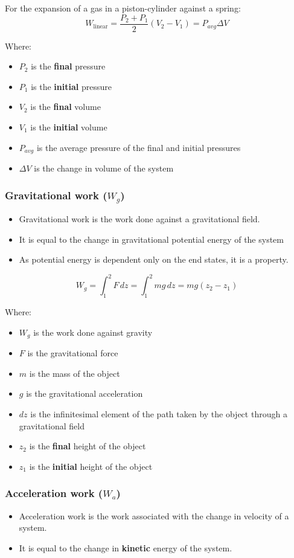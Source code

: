 \documentclass[11pt]{article}
\begin{document}
For the expansion of a gas in a piston-cylinder against a spring:
\[W_{\text{linear}} = \frac{P_2 + P_1}{2} \left(V_2 - V_1 \right) = P_{avg} \Delta V\]

Where:
\begin{itemize}
\item \(P_2\) is the \textbf{final} pressure
\item \(P_1\) is the \textbf{initial} pressure
\item \(V_2\) is the \textbf{final} volume
\item \(V_1\) is the \textbf{initial} volume
\item \(P_{avg}\) is the average pressure of the final and initial pressures
\item \(\Delta V\) is the change in volume of the system
\end{itemize}
\subsubsection{Gravitational work (\(W_g\))}
\label{sec:orgfa14067}
\begin{itemize}
\item Gravitational work is the work done against a gravitational field.
\item It is equal to the change in gravitational potential energy of the system
\item As potential energy is dependent only on the end states, it is a property.
\end{itemize}

\[W_g = \int_1^2 F \, dz = \int_1^2 mg \, dz = mg(z_2 - z_1)\]

Where:
\begin{itemize}
\item \(W_g\) is the work done against gravity
\item \(F\) is the gravitational force
\item \(m\) is the mass of the object
\item \(g\) is the gravitational acceleration
\item \(dz\) is the infinitesimal element of the path taken by the object through a gravitational field
\item \(z_2\) is the \textbf{final} height of the object
\item \(z_1\) is the \textbf{initial} height of the object
\end{itemize}

\newpage
\subsubsection{Acceleration work (\(W_a\))}
\label{sec:org06dbdeb}
\begin{itemize}
\item Acceleration work is the work associated with the change in velocity of a system.
\item It is equal to the change in \textbf{kinetic} energy of the system.
\end{itemize}
\end{document}
